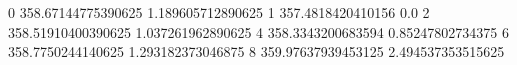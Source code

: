 0 358.67144775390625 1.189605712890625
1 357.4818420410156 0.0
2 358.51910400390625 1.037261962890625
4 358.3343200683594 0.85247802734375
6 358.7750244140625 1.293182373046875
8 359.97637939453125 2.494537353515625
